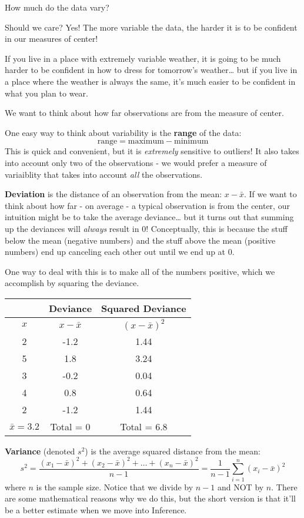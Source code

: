 \documentclass[
]{book}
\begin{document}
How much do the data vary?

Should we care? Yes! The more variable the data, the harder it is to be confident in our measures of center!

If you live in a place with extremely variable weather, it is going to be much harder to be confident in how to dress for tomorrow's weather\ldots{} but if you live in a place where the weather is always the same, it's much easier to be confident in what you plan to wear.

We want to think about how far observations are from the measure of center.

One easy way to think about variability is the \textbf{range} of the data: \[\text{range} = \text{maximum} - \text{minimum}\] This is quick and convenient, but it is \emph{extremely} sensitive to outliers! It also takes into account only two of the observations - we would prefer a measure of variaiblity that takes into account \emph{all} the observations.

\textbf{Deviation} is the distance of an observation from the mean: \(x - \bar{x}\). If we want to think about how far - on average - a typical observation is from the center, our intuition might be to take the average deviance\ldots{} but it turns out that summing up the deviances will \emph{always} result in 0! Conceptually, this is because the stuff below the mean (negative numbers) and the stuff above the mean (positive numbers) end up canceling each other out until we end up at 0.

One way to deal with this is to make all of the numbers positive, which we accomplish by squaring the deviance.

\begin{longtable}[]{@{}ccc@{}}
\toprule
& Deviance & Squared Deviance \\
\midrule
\endhead
\(x\) & \(x - \bar{x}\) & \((x - \bar{x})^2\) \\
2 & -1.2 & 1.44 \\
5 & 1.8 & 3.24 \\
3 & -0.2 & 0.04 \\
4 & 0.8 & 0.64 \\
2 & -1.2 & 1.44 \\
\(\bar{x}=3.2\) & Total = 0 & Total = 6.8 \\
\bottomrule
\end{longtable}

\textbf{Variance} (denoted \(s^2\)) is the average squared distance from the mean:
\[
  s^2 = \frac{(x_1-\bar{x})^2 + (x_2-\bar{x})^2 + \dots + (x_n-\bar{x})^2}{n-1} = \frac{1}{n-1}\sum_{i=1}^n (x_i - \bar{x})^2
\]
where \(n\) is the sample size. Notice that we divide by \(n-1\) and NOT by \(n\). There are some mathematical reasons why we do this, but the short version is that it'll be a better estimate when we move into Inference.
\end{document}
